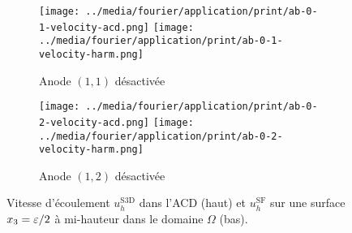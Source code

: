\begin{figure}[!h]
  \begin{center}
    \begin{subfigure}[t]{\textwidth}
      \begin{center}
        \texttt{[image: ../media/fourier/application/print/ab-0-1-velocity-acd.png]}
        \texttt{[image: ../media/fourier/application/print/ab-0-1-velocity-harm.png]}
        \caption{Anode $(1,1)$ désactivée}
        \label{fig:}
      \end{center}
    \end{subfigure}

    \begin{subfigure}[t]{\textwidth}
      \begin{center}
        \texttt{[image: ../media/fourier/application/print/ab-0-2-velocity-acd.png]}
        \texttt{[image: ../media/fourier/application/print/ab-0-2-velocity-harm.png]}
        \caption{Anode $(1,2)$ désactivée}
        \label{fig:}
      \end{center}
    \end{subfigure}


    \caption{Vitesse d'écoulement $u_h^\mathrm{S3D}$ dans l'ACD (haut)
      et $u_h^\mathrm{SF}$ sur une surface $x_3 = \varepsilon / 2$ à
      mi-hauteur dans le domaine $\Omega$ (bas).}

    \label{fig:harmonic-velocity-comp-a}
  \end{center}
\end{figure}


